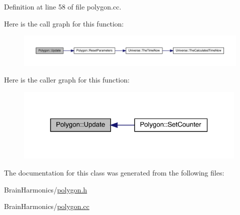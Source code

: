 Definition at line 58 of file polygon.\+cc.

Here is the call graph for this function\+:
\nopagebreak
\begin{figure}[H]
\begin{center}
\leavevmode
\includegraphics[width=350pt]{class_polygon_ab3fe58d8ffce2e16589958def88aa188_cgraph}
\end{center}
\end{figure}
Here is the caller graph for this function\+:
\nopagebreak
\begin{figure}[H]
\begin{center}
\leavevmode
\includegraphics[width=315pt]{class_polygon_ab3fe58d8ffce2e16589958def88aa188_icgraph}
\end{center}
\end{figure}


The documentation for this class was generated from the following files\+:\begin{DoxyCompactItemize}
\item 
Brain\+Harmonics/\hyperlink{polygon_8h}{polygon.\+h}\item 
Brain\+Harmonics/\hyperlink{polygon_8cc}{polygon.\+cc}\end{DoxyCompactItemize}
